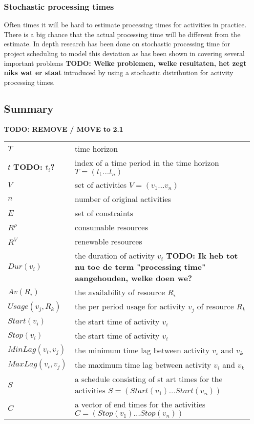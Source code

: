 \documentclass{article}
\newcommand{\TODO}[1]{{\color{red}\textbf{TODO: #1}}}
\begin{document}
\subsubsection{Stochastic processing times}
Often times it will be hard to estimate processing times for activities in practice.
There is a big chance that the actual processing time will be  different from the estimate.
In depth research has been done on stochastic processing time for project scheduling to model this deviation as has been shown in \cite{brucker99} covering several important problems \TODO{Welke problemen, welke resultaten, het zegt niks wat er staat} introduced by using a stochastic distribution for activity processing times.

\subsection{Summary}
\TODO{REMOVE / MOVE to 2.1}
\begin{tabular}{l l}
\hline
$T$ & time horizon \\
$t$ \TODO{$t_i$?} &  index of a time period in the time horizon $T = (t_1 \ldots t_n)$\\
$V$ & set of activities $V = (v_1 \ldots v_n)$ \\
$n$ & number of original activities \\
$E$ & set of constraints \\
$R^{\rho}$ & consumable resources \\
$R^V$ & renewable resources \\
$Dur(v_i)$ & the duration of activity $v_i$ \TODO{Ik heb tot nu toe de term "processing time" aangehouden, welke doen we?}\\
$Av(R_i)$ & the availability of resource $R_i$ \\
$Usage(v_j, R_k)$ & the per period usage for activity $v_j$ of resource $R_k$ \\
$Start(v_i)$ & the start time of activity $v_i$ \\
$Stop(v_i)$ & the start time of activity $v_i$ \\
$MinLag(v_i, v_j)$ & the minimum time lag between activity $v_i$ and $v_k$ \\
$MaxLag(v_i, v_j)$ & the maximum time lag between activity $v_i$ and $v_k$ \\
$S$ & a schedule consisting of st
art times for the activities $S = (Start(v_1) \ldots Start(v_n))$ \\
$C$ & a vector of end times for the activities $C = (Stop(v_1) \ldots Stop(v_n))$ \\
\hline
\end{tabular}
\end{document}
